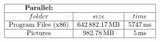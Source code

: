 \documentclass{article}
\begin{document}
    \begin{doublespacing}
      \begin{align*}
        \begin{tabular}{|*{3}{c|}}
          \hline
          \multicolumn{1}{|c}{\bfseries Parallel:} & \multicolumn{1}{c}{} & \multicolumn{1}{c|}{} \\
          \hline
          $folder$ & $size$ & $time$ \\
          \hline
          Program Files (x86) & $\SI{642882.17}{\mega\byte}$ & $\SI{5747}{\milli\second}$ \\
          \hline
          Pictures & $\SI{982.78}{\mega\byte}$ & $\SI{5}{\milli\second}$ \\
          \hline
        \end{tabular}
      \end{align*}
    \end{doublespacing}
\end{document}
